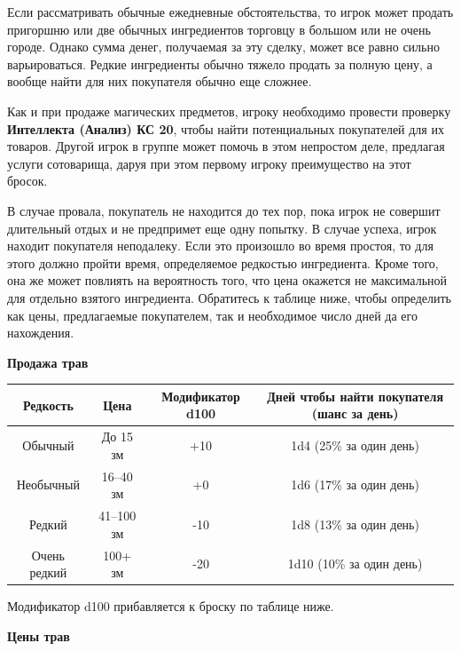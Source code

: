 \documentclass[a4paper, 9pt, twocolumn]{book}
\begin{document}
	Если рассматривать обычные ежедневные обстоятельства, то игрок может продать пригоршню или две обычных ингредиентов торговцу в большом или не очень городе. Однако сумма денег, получаемая за эту сделку, может все равно сильно варьироваться. Редкие ингредиенты обычно тяжело продать за полную цену, а вообще найти для них покупателя обычно еще сложнее.
	
	Как и при продаже магических предметов, игроку необходимо провести проверку \textbf{Интеллекта (Анализ) КС 20}, чтобы найти потенциальных покупателей для их товаров. Другой игрок в группе может помочь в этом непростом деле, предлагая услуги сотоварища, даруя при этом первому игроку преимущество на этот бросок.
	
	В случае провала, покупатель не находится до тех пор, пока игрок не совершит длительный отдых и не предпримет еще одну попытку. В случае успеха, игрок  находит покупателя неподалеку. Если это произошло во время простоя, то для этого должно пройти время, определяемое  редкостью ингредиента. Кроме того, она же может повлиять на вероятность того, что цена окажется не максимальной для отдельно взятого ингредиента. Обратитесь к таблице ниже, чтобы определить как цены, предлагаемые покупателем, так и необходимое число дней да его нахождения.
	
	\textbf{Продажа трав}
	
	\begin{center}
		
		\begin{tabular}{|c|c|c|c|}
			\hline
			\textbf{Редкость} & \textbf{Цена} & \textbf{Модификатор d100} & \textbf{Дней чтобы найти покупателя (шанс за день)} \\
			\hline
			Обычный & До 15 зм & +10 & 1d4 (25\% за один день) \\
			\hline
			Необычный & 16--40 зм & +0 & 1d6 (17\% за один день) \\
			\hline
			Редкий & 41--100 зм & -10 & 1d8 (13\% за один день) \\
			\hline
			Очень редкий & 100+ зм & -20 & 1d10 (10\% за один день) \\
			\hline
		\end{tabular}
		
	\end{center}

	Модификатор d100 прибавляется к броску по таблице ниже.
	
	\medspace

	\textbf{Цены трав}
	
\end{document}
